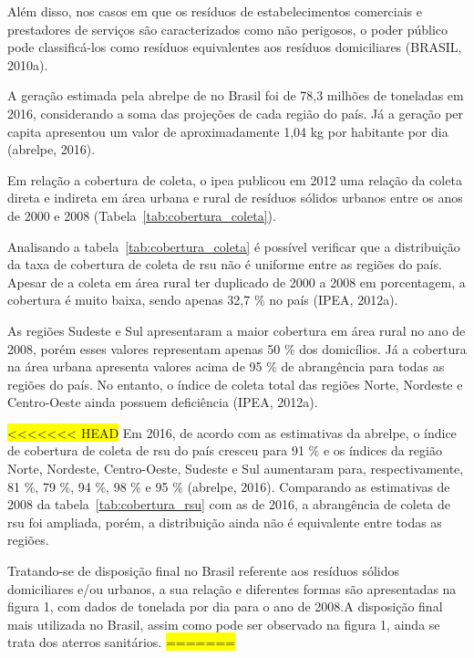 	Além disso, nos casos em que os resíduos de estabelecimentos comerciais e prestadores de serviços são caracterizados como não perigosos, o poder público pode classificá-los como resíduos equivalentes aos resíduos domiciliares (BRASIL, 2010a).
	
	A geração estimada pela \gls{abrelpe} de  no Brasil foi de 78,3 milhões de toneladas em 2016, considerando a soma das projeções de cada região do país. Já a geração per capita apresentou um valor de aproximadamente 1,04 kg por habitante por dia (\gls{abrelpe}, 2016).
	
	Em relação a cobertura de coleta, o \gls{ipea} publicou em 2012 uma relação da coleta direta e indireta em área urbana e rural de resíduos sólidos urbanos entre os anos de 2000 e 2008 (Tabela~\ref{tab:cobertura_coleta}).
	
	
	
	Analisando a tabela~\ref{tab:cobertura_coleta} é possível verificar que a distribuição da taxa de cobertura de coleta de \gls{rsu} não é uniforme entre as regiões do país. Apesar de a coleta em área rural ter duplicado de 2000 a 2008 em porcentagem, a cobertura é muito baixa, sendo apenas 32,7 \% no país (IPEA, 2012a).
	
	As regiões Sudeste e Sul apresentaram a maior cobertura em área rural no ano de 2008, porém esses valores representam apenas 50 \% dos domicílios. Já a cobertura na área urbana apresenta valores acima de 95 \% de abrangência para todas as regiões do país. No entanto, o índice de coleta total das regiões Norte, Nordeste e Centro-Oeste ainda possuem deficiência (IPEA, 2012a).
	
\colorbox{yellow}{<<<<<<< HEAD}
	Em 2016, de acordo com as estimativas da \gls{abrelpe}, o índice de cobertura de coleta de \gls{rsu} do país cresceu para 91 \% e os índices da região Norte, Nordeste, Centro-Oeste, Sudeste e Sul aumentaram para, respectivamente, 81 \%, 79 \%, 94 \%, 98 \% e 95 \% (\gls{abrelpe}, 2016). Comparando as estimativas de 2008 da tabela~\ref{tab:cobertura_rsu} com as de 2016, a abrangência de coleta de \gls{rsu} foi ampliada, porém, a distribuição ainda não é equivalente entre todas as regiões.
	
	Tratando-se de disposição final no Brasil referente aos resíduos sólidos domiciliares e/ou urbanos, a sua relação e diferentes formas são apresentadas na figura 1, com dados de tonelada por dia para o ano de 2008.A disposição final mais utilizada no Brasil, assim como pode ser observado na figura 1, ainda se trata dos aterros sanitários. 
\colorbox{yellow}{=======}

